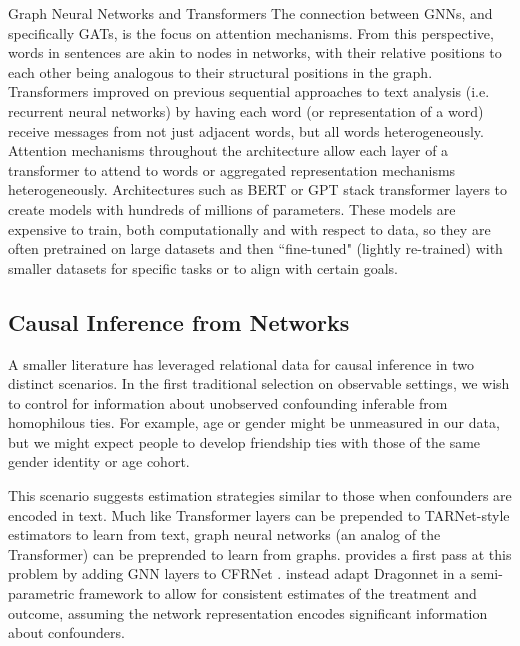 \begin{TCBBox}[label=Box:gnn]{Graph Neural Networks and Transformers}
The connection between GNNs, and specifically GATs, is the focus on attention mechanisms. From this perspective, words in sentences are akin to nodes in networks, with their relative positions to each other being analogous to their structural positions in the graph. Transformers improved on previous sequential approaches to text analysis (i.e. recurrent neural networks) by having each word (or representation of a word) receive messages from not just adjacent words, but all words heterogeneously. Attention mechanisms throughout the architecture allow each layer of a transformer to attend to words or aggregated representation mechanisms heterogeneously. Architectures such as BERT or GPT stack transformer layers to create models with hundreds of millions of parameters. These models are expensive to train, both computationally and with respect to data, so they are often pretrained on large datasets and then ``fine-tuned" (lightly re-trained) with smaller datasets for specific tasks or to align with certain goals.  

\end{TCBBox}

\subsection{Causal Inference from Networks}
\label{subsection:networks}

A smaller literature has leveraged relational data for causal inference in two distinct scenarios. In the first traditional selection on observable settings, we wish to control for information about unobserved confounding inferable from homophilous ties. For example, age or gender might be unmeasured in our data, but we might expect people to develop friendship ties with those of the same gender identity or age cohort.

This scenario suggests estimation strategies similar to those when confounders are encoded in text. Much like Transformer layers can be prepended to TARNet-style estimators to learn from text, graph neural networks (an analog of the Transformer) can be preprended to learn from graphs. \citet{guo2019counterfactual} provides a first pass at this problem by adding  GNN layers to CFRNet \cite{Shalit2017}. \citet{Veitch2019UsingET} instead adapt Dragonnet in a semi-parametric framework to allow for consistent estimates of the treatment and outcome, assuming the network representation encodes significant information about confounders.

